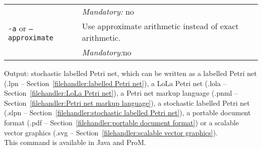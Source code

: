 {\begin{tabularx}{\linewidth}{lX}
&\textit{Mandatory:} \quad no\\
\texttt{-a} or \texttt{--approximate} & Use approximate arithmetic instead of exact arithmetic.\\
&\textit{Mandatory:}\quad no\\
\bottomrule
\end{tabularx}
\noindent Output: stochastic labelled Petri net, which can be written as a labelled Petri net (.lpn -- Section~\ref{filehandler:labelled Petri net}), a LoLa Petri net (.lola -- Section~\ref{filehandler:LoLa Petri net}), a Petri net markup language (.pnml -- Section~\ref{filehandler:Petri net markup language}), a stochastic labelled Petri net (.slpn -- Section~\ref{filehandler:stochastic labelled Petri net}), a portable document format (.pdf -- Section~\ref{filehandler:portable document format}) or a scalable vector graphics (.svg -- Section~\ref{filehandler:scalable vector graphics}).
\\This command is available in Java and ProM.
}
